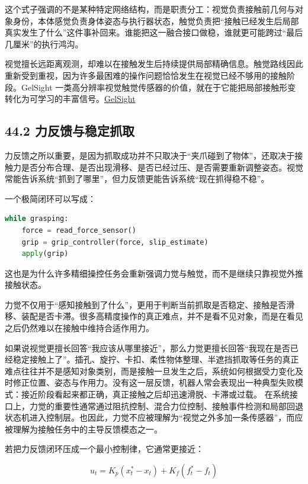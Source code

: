 这个式子强调的不是某种特定网络结构，而是职责分工：视觉负责接触前几何与对象身份，本体感觉负责身体姿态与执行器状态，触觉负责把“接触已经发生后局部真实发生了什么”这件事补回来。谁能把这一融合接口做稳，谁就更可能跨过“最后几厘米”的执行鸿沟。

视觉擅长远距离观测，却难以在接触发生后持续提供局部精确信息。触觉路线因此重新受到重视，因为许多最困难的操作问题恰恰发生在视觉已经不够用的接触阶段。GelSight 一类高分辨率视觉触觉传感器的价值，就在于它能把局部接触形变转化为可学习的丰富信号。\href{https://arxiv.org/abs/1706.09942}{GelSight}

\subsection*{44.2 力反馈与稳定抓取}


力反馈之所以重要，是因为抓取成功并不只取决于“夹爪碰到了物体”，还取决于接触力是否分布合理、是否出现滑移、是否已经过压、是否需要重新调整姿态。视觉常能告诉系统“抓到了哪里”，但力反馈更能告诉系统“现在抓得稳不稳”。

一个极简闭环可以写成：

\begin{lstlisting}[language=python]
while grasping:
    force = read_force_sensor()
    grip = grip_controller(force, slip_estimate)
    apply(grip)
\end{lstlisting}

这也是为什么许多精细操控任务会重新强调力觉与触觉，而不是继续只靠视觉外推接触状态。

力觉不仅用于“感知接触到了什么”，更用于判断当前抓取是否稳定、接触是否滑移、装配是否卡滞。很多高精度操作的真正难点，并不是看不见对象，而是在看见之后仍然难以在接触中维持合适作用力。

如果说视觉更擅长回答“我应该从哪里接近”，那么力觉更擅长回答“我现在是否已经稳定接触上了”。插孔、旋拧、卡扣、柔性物体整理、半遮挡抓取等任务的真正难点往往并不是感知对象类别，而是接触一旦发生之后，系统如何根据受力变化及时修正位置、姿态与作用力。没有这一层反馈，机器人常会表现出一种典型失败模式：接近阶段看起来都正确，真正接触之后却迅速滑脱、卡滞或过载。 在系统接口上，力觉的重要性通常通过阻抗控制、混合力位控制、接触事件检测和局部回退状态机进入控制层。也因此，力觉不应被理解为“视觉之外多加一条传感器”，而应被理解为接触任务中的主导反馈模态之一。

若把力反馈闭环压成一个最小控制律，它通常更接近：

\begin{equation*}
u_t = K_p(x_t^{*}-x_t) + K_f(f_t^{*}-f_t)
\end{equation*}

